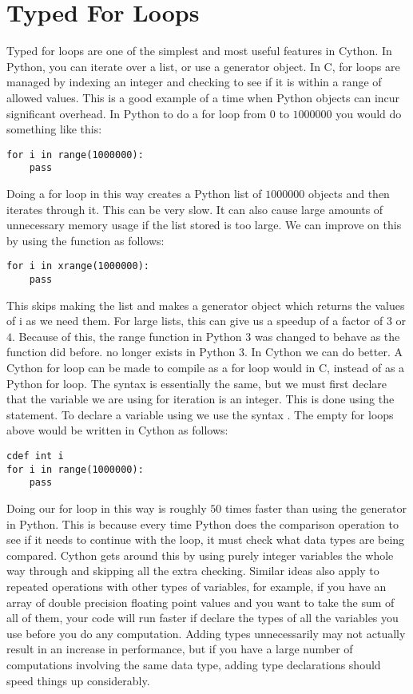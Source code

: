 \section*{Typed For Loops}

Typed for loops are one of the simplest and most useful features in Cython.
In Python, you can iterate over a list, or use a generator object.
In C, for loops are managed by indexing an integer and checking to see if it is within a range of allowed values.
This is a good example of a time when Python objects can incur significant overhead.
In Python to do a for loop from $0$ to $1000000$ you would do something like this:
\begin{lstlisting}
for i in range(1000000):
	pass
\end{lstlisting}
Doing a for loop in this way creates a Python list of $1000000$ objects and then iterates through it.
This can  be very slow.
It can also cause large amounts of unnecessary memory usage if the list stored is too large.
We can improve on this by using the  function as follows:
\begin{lstlisting}
for i in xrange(1000000):
	pass
\end{lstlisting}
This skips making the list and makes a generator object which returns the values of i as we need them.
For large lists, this can give us a speedup of a factor of $3$ or $4$.
Because of this, the range function in Python 3 was changed to behave as the  function did before.
 no longer exists in Python 3.
In Cython we can do better.
A Cython for loop can be made to compile as a for loop would in C, instead of as a Python for loop.
The syntax is essentially the same, but we must first declare that the variable we are using for iteration is an integer.
This is done using the  statement.
To declare a variable using  we use the syntax .
The empty for loops above would be written in Cython as follows:
\begin{lstlisting}
cdef int i
for i in range(1000000):
	pass
\end{lstlisting}
Doing our for loop in this way is roughly $50$ times faster than using the generator in Python.
This is because every time Python does the comparison operation to see if it needs to continue with the loop, it must check what data types are being compared.
Cython gets around this by using purely integer variables the whole way through and skipping all the extra checking.
Similar ideas also apply to repeated operations with other types of variables, for example, if you have an array of double precision floating point values and you want to take the sum of all of them, your code will run faster if declare the types of all the variables you use before you do any computation.
Adding types unnecessarily may not actually result in an increase in performance, but if you have a large number of computations involving the same data type, adding type declarations should speed things up considerably.

